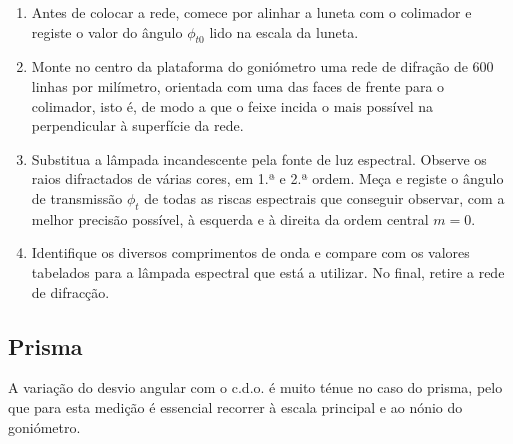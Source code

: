 \documentclass[12pt,a4paper,oneside]{paper}
\begin{document}
\begin{enumerate}
	\item Antes de colocar a rede, comece por alinhar a luneta com o colimador e registe o valor do ângulo $\phi_{t0}$ lido
	na escala da luneta.
	\item Monte no centro da plataforma do goniómetro uma rede de difração de 600 linhas por milímetro, orientada com uma das
	faces de frente para o colimador, isto é, de modo a que o feixe incida o mais possível na perpendicular à superfície da rede.
	\item Substitua a lâmpada incandescente pela fonte de luz espectral. Observe os raios difractados de várias cores, em 1.ª e 2.ª ordem. Meça e registe o ângulo de transmissão $\phi_t$ de todas as riscas espectrais que conseguir observar, com a melhor precisão possível, à esquerda e à direita da ordem central $m=0$.
	\item Identifique os diversos comprimentos de onda e compare com os valores tabelados para a lâmpada espectral que está a utilizar. No final, retire a rede de difracção.
\end{enumerate}

\subsection*{\sf Prisma}
A variação do desvio angular com o c.d.o. é muito ténue no caso do prisma, pelo que para esta medição é essencial recorrer
à escala principal e ao nónio do goniómetro. 
\end{document}
